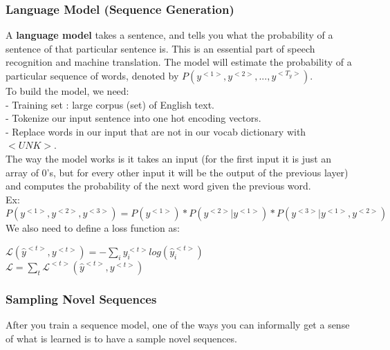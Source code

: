 \documentclass[11pt, a4paper]{article}
\begin{document}
\begin{spacing}{1.1}
	\subsubsection{Language Model (Sequence Generation)}
	A \textbf{language model} takes a sentence, and tells you what the probability of a sentence of that particular sentence is. This is an essential part of speech recognition and machine translation. The model will estimate the probability of a particular sequence of words, denoted by $P(y^{<1>}, y^{<2>}, ..., y^{<T_y>})$. \vspace*{2mm}\\
	To build the model, we need: \\
	- Training set : large corpus (set) of English text. \\
	- Tokenize our input sentence into one hot encoding vectors. \\
	- Replace words in our input that are not in our vocab dictionary with $<UNK>$. \vspace*{2mm}\\
	The way the model works is it takes an input (for the first input it is just an array of 0's, but for every other input it will be the output of the previous layer) and computes the probability of the next word given the previous word. \vspace*{1mm}\\
	Ex: $P(y^{<1>}, y^{<2>}, y^{<3>}) = P(y^{<1>}) * P(y^{<2>}|y^{<1>}) * P(y^{<3>}|y^{<1>},y^{<2>})$ \vspace*{1.5mm}\\
	We also need to define a loss function as:
	\begin{center}
	$\mathcal{L} (\hat{y}^{<t>}, y^{<t>}) = -\sum_i y_i^{<t>}log(\hat{y}_i^{<t>})$ \\
	$\mathcal{L} = \sum_t \mathcal{L}^{<t>}(\hat{y}^{<t>}, y^{<t>})$
	\end{center} \newpage

	\subsubsection{Sampling Novel Sequences}
	After you train a sequence model, one of the ways you can informally get a sense of what is learned is to have a sample novel sequences. 
	
	
	
	
	
	
	
	
	
	
	
	
	
	
	
	
	
	
\end{spacing}
\end{document}

